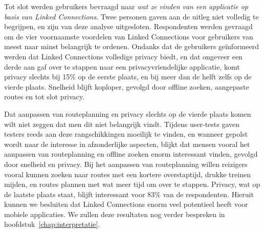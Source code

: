 Tot slot werden gebruikers bevraagd naar \emph{wat ze vinden van een applicatie op basis van Linked Connections}. Twee personen gaven aan de uitleg niet volledig te begrijpen, en zijn van deze analyse uitgesloten.
Respondenten werden gevraagd om de vier voornaamste voordelen van Linked Connections voor gebruikers van meest naar minst belangrijk te ordenen. Ondanks dat de gebruikers geïnformeerd werden dat Linked Connections volledige privacy biedt, en dat ongeveer een derde aan gaf over te stappen naar een privacyvriendelijke applicatie, komt privacy slechts bij 15\% op de eerste plaats, en bij meer dan de helft zelfs op de vierde plaats. Snelheid blijft koploper, gevolgd door offline zoeken, aangepaste routes en tot slot privacy.

Dat aanpassen van routeplanning en privacy slechts op de vierde plaats komen wilt niet zeggen dat men dit niet belangrijk vindt. Tijdens user-tests gaven testers reeds aan deze rangschikkingen moeilijk te vinden, en wanneer gepolst wordt naar de interesse in afzonderlijke aspecten, blijkt dat mensen vooral het aanpassen van routeplanning en offline zoeken enorm interessant vinden, gevolgd door snelheid en privacy. Bij het aanpassen van routeplanning willen reizigers vooral kunnen zoeken naar routes met een kortere overstaptijd, drukke treinen mijden, en routes plannen met wat meer tijd om over te stappen. Privacy, wat op de laatste plaats staat, blijft interessant voor 83\% van de respondenten. Hieruit kunnen we besluiten dat Linked Connections enorm veel potentieel heeft voor mobiele applicaties. We zullen deze resultaten nog verder bespreken in hoofdstuk~\ref{chap:interpretatie}.

